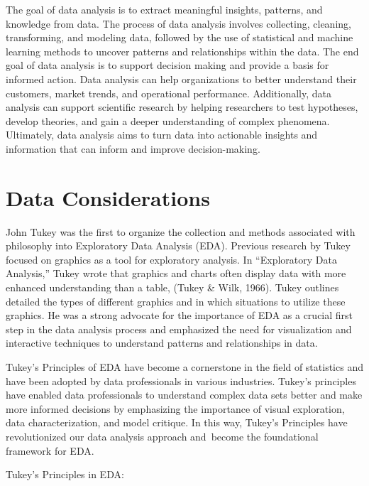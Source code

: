 \documentclass[print]{nuthesis}
\begin{document}
The goal of data analysis is to extract meaningful insights, patterns, and knowledge from data.
The process of data analysis involves collecting, cleaning, transforming, and modeling data, followed by the use of statistical and machine learning methods to uncover patterns and relationships within the data.
The end goal of data analysis is to support decision making and provide a basis for informed action.
Data analysis can help organizations to better understand their customers, market trends, and operational performance.
Additionally, data analysis can support scientific research by helping researchers to test hypotheses, develop theories, and gain a deeper understanding of complex phenomena.
Ultimately, data analysis aims to turn data into actionable insights and information that can inform and improve decision-making.

\hypertarget{data-considerations}{%
\section{Data Considerations}\label{data-considerations}}

John Tukey was the first to organize the collection and methods associated with philosophy into Exploratory Data Analysis (EDA).
Previous research by Tukey focused on graphics as a tool for exploratory analysis.
In ``Exploratory Data Analysis,'' Tukey wrote that graphics and charts often display data with more enhanced understanding than a table, (Tukey \& Wilk, 1966).
Tukey outlines detailed the types of different graphics and in which situations to utilize these graphics.
He was a strong advocate for the importance of EDA as a crucial first step in the data analysis process and emphasized the need for visualization and interactive techniques to understand patterns and relationships in data.

Tukey's Principles of EDA have become a cornerstone in the field of statistics and have been adopted by data professionals in various industries.
Tukey's principles have enabled data professionals to understand complex data sets better and make more informed decisions by emphasizing the importance of visual exploration, data characterization, and model critique.
In this way, Tukey's Principles have revolutionized our data analysis approach and~become the foundational framework for EDA.

Tukey's Principles in EDA:
\end{document}
